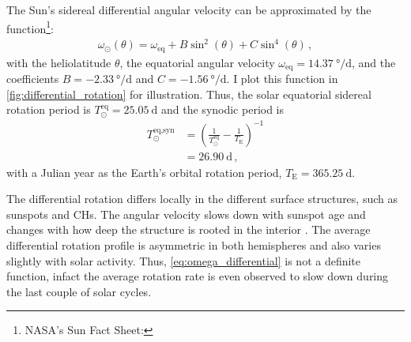 The Sun's sidereal differential angular velocity can be approximated by the function\footnote{NASA's Sun Fact Sheet: }:
\begin{align}
	\omega_\odot(\theta) = \omega_\text{eq} + B \sin^2(\theta) + C \sin^4(\theta)	\,,	\label{eq:omega_differential}
\end{align}
with the heliolatitude $\theta$, the equatorial angular velocity $\omega_\text{eq} = \SI{14.37}{\degree\per\day}$, and the coefficients $B = \SI{-2.33}{\degree\per\day}$ and $C = \SI{-1.56}{\degree\per\day}$. I plot this function in \autoref{fig:differential_rotation} for illustration. Thus, the solar equatorial sidereal rotation period is $T_\odot^\text{eq} = \SI{25.05}{\day}$ and the synodic period is
\begin{align}
	T_\odot^\text{eq,syn} &= \left(\frac{1}{T_\odot^\text{eq}} - \frac{1}{T_\text{E}}\right)^{-1}\\
	&= \SI{26.90}{\day}	\,,	\nonumber
\end{align}
with a Julian year as the Earth's orbital rotation period, $T_\text{E} = \SI{365.25}{\day}$.
\begin{figure}[htb]
\end{figure}

The differential rotation differs locally in the different surface structures, such as sunspots and CHs. The angular velocity slows down with sunspot age and changes with how deep the structure is rooted in the interior \citep{Pulkkinen1998}. The average differential rotation profile is asymmetric in both hemispheres and also varies slightly with solar activity. Thus, \autoref{eq:omega_differential} is not a definite function, infact the average rotation rate is even observed to slow down during the last couple of solar cycles.

